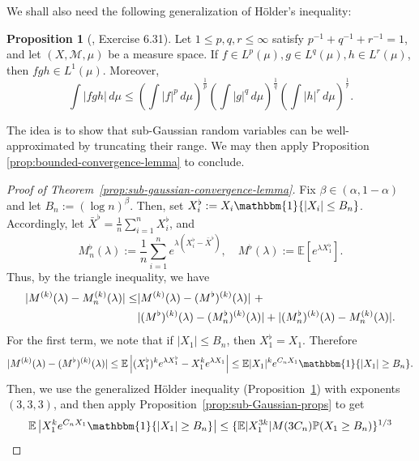 \documentclass{article}
\theoremstyle{definition}
\newtheorem{proposition}{Proposition}
\newcommand{\E}{\mathbb{E}}
\newcommand{\1}{\mathbbm{1}}
\renewcommand{\P}{\mathbb{P}}
\begin{document}
We shall also need the following generalization of H\"older's inequality: 
\begin{proposition}[\cite{folland1999real}, Exercise 6.31]
\label{prop:generalized-holder}
    Let $1 \leq p, q, r \leq \infty$ satisfy $p^{-1} + q^{-1} + r^{-1} = 1$, and let $(X, \mathcal M, \mu)$ be a measure space. If $f \in L^p(\mu), g \in L^q(\mu), h \in L^r(\mu)$, then $fgh \in L^1(\mu)$. Moreover,
    \[
    \int |fgh| \, d\mu \leq \left(\int |f|^p \, d\mu\right)^{\frac1p} \left(\int |g|^q \, d\mu\right)^{\frac1q} \left(\int |h|^r \, d\mu\right)^{\frac1r}.
    \]
\end{proposition}
The idea is to show that sub-Gaussian random variables can be well-approximated by truncating their range. We may then apply Proposition \ref{prop:bounded-convergence-lemma} to conclude. 
\begin{proof}[Proof of Theorem~\ref{prop:sub-gaussian-convergence-lemma}]
    Fix $\beta \in (\alpha, 1- \alpha)$ and let $B_n := (\log n)^\beta$. Then, set $X_i^{\flat} := X_i\1\{|X_i| \leq B_n\}$. Accordingly, let $\bar X^{\flat} = \frac1n\sum_{i=1}^n X_i^{\flat}$, and 
    \[
    M_n^{\flat}(\lambda) := \frac1n\sum_{i=1}^n e^{\lambda (X^{\flat}_i - \bar X^{\flat})},  \quad M^\flat(\lambda) := \E[e^{\lambda X^{\flat}_1}].
    \]
    Thus, by the triangle inequality, we have 
    \begin{align}
        |M^{(k)}(\lambda) - M_n^{(k)}(\lambda)| \leq &|M^{(k)}(\lambda) - (M^\flat)^{(k)}(\lambda)| \ + \notag\\& |(M^\flat)^{(k)}(\lambda) - (M^\flat_n)^{(k)}(\lambda)| + |(M^\flat_n)^{(k)}(\lambda) - M_n^{(k)}(\lambda)|. 
        \label{eqn:M-flat-ineq}
    \end{align}
    For the first term, we note that if $|X_1| \leq B_n$, then $X^\flat_1 = X_1$. Therefore 
    \begin{equation}
        |M^{(k)}(\lambda) - (M^\flat)^{(k)}(\lambda)| \leq \E\left|(X^\flat_1)^{k}e^{\lambda X^\flat_1} - X_1^{k}e^{\lambda X_1}\right| 
    \leq\E|X_1|^{k}e^{C_nX_1}\1\{|X_1| \geq B_n\}.
        \label{eqn:mgf-cutoff-eq-1}
    \end{equation}
    Then, we use the generalized H\"older inequality (Proposition~\ref{prop:generalized-holder}) with exponents $(3, 3, 3)$, and then apply Proposition~\ref{prop:sub-Gaussian-props} to get 
    \begin{align}
        \E\left|X_1^{k}e^{C_nX_1}\1\{|X_1| \geq B_n\}\right|&\leq\{\E|X_1^{3k}|M(3C_n)\P(X_1 \geq B_n)\}^{1/3} \notag \\

\end{align}
\end{proof}
\end{document}

